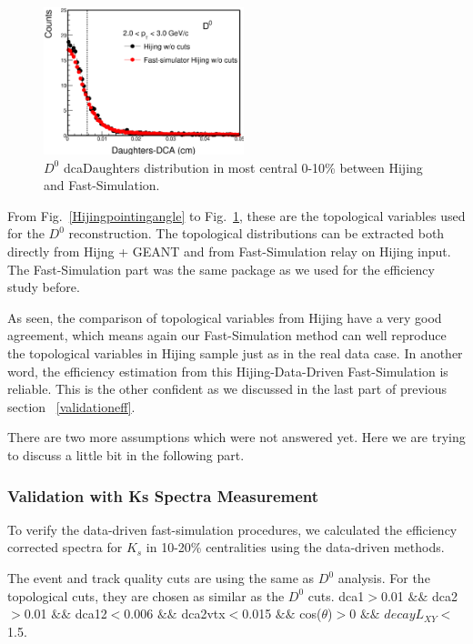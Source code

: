 \begin{figure}[htbp]
\centering
\includegraphics[keepaspectratio,width=0.52\textwidth]{figure/Run14_D0HFT/HijingdcaDaughters.eps}
\caption{$D^0$ dcaDaughters distribution in most central 0-10\% between Hijing and Fast-Simulation.}
\label{HijingdcaDaughters}
\end{figure}

From Fig.~\ref{Hijingpointingangle} to Fig.~\ref{HijingdcaDaughters}, these are the topological variables used for the $D^0$ reconstruction. The topological distributions can be extracted both directly from Hijng + GEANT and from Fast-Simulation relay on Hijing input. The Fast-Simulation part was the same package as we used for the efficiency study before.

As seen, the comparison of topological variables from Hijing have a very good agreement, which means again our Fast-Simulation method can well reproduce the topological variables in Hijing sample just as in the real data case. In another word, the efficiency estimation from this Hijing-Data-Driven Fast-Simulation is reliable.  This is the other confident as we discussed in the last part of previous section ~\ref{validationeff}.


There are two more assumptions which were not answered yet. Here we are trying to discuss a little bit in the following part.

\subsubsection{Validation with Ks Spectra Measurement}
\label{validationKs}
 To verify the data-driven fast-simulation procedures, we calculated the efficiency corrected spectra for $K_{s}$ in 10-20\% centralities using the data-driven methods. 
 
 The event and track quality cuts are using the same as $D^0$ analysis. For the topological cuts, they are chosen as similar as the $D^0$ cuts. dca1$>$0.01 $\&\&$ dca2$>$0.01 $\&\&$ dca12$<$0.006 $\&\&$ dca2vtx$<$0.015 $\&\&$ cos($\theta$)$>$0 $\&\&$ $decayL_{XY}<$1.5.


